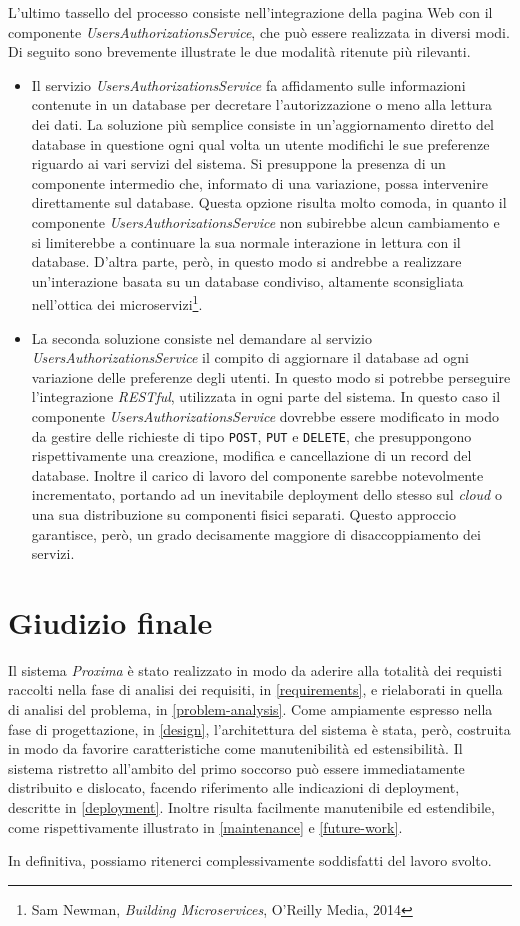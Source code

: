 \documentclass[a4paper,12pt]{report}
\begin{document}
L'ultimo tassello del processo consiste nell'integrazione della pagina Web con il componente \emph{UsersAuthorizationsService}, che può essere realizzata in diversi modi. Di seguito sono brevemente illustrate le due modalità ritenute più rilevanti.
\begin{itemize}
	\item Il servizio \emph{UsersAuthorizationsService} fa affidamento sulle informazioni contenute in un database per decretare l'autorizzazione o meno alla lettura dei dati. La soluzione più semplice consiste in un'aggiornamento diretto del database in questione ogni qual volta un utente modifichi le sue preferenze riguardo ai vari servizi del sistema. Si presuppone la presenza di un componente intermedio che, informato di una variazione, possa intervenire direttamente sul database. Questa opzione risulta molto comoda, in quanto il componente \emph{UsersAuthorizationsService} non subirebbe alcun cambiamento e si limiterebbe a continuare la sua normale interazione in lettura con il database. D'altra parte, però, in questo modo si andrebbe a realizzare un'interazione basata su un database condiviso, altamente sconsigliata nell'ottica dei microservizi\footnote{Sam Newman, {\em Building Microservices}, O'Reilly Media, 2014}.
	\item La seconda soluzione consiste nel demandare al servizio \emph{UsersAuthorizationsService} il compito di aggiornare il database ad ogni variazione delle preferenze degli utenti. In questo modo si potrebbe perseguire l'integrazione \emph{RESTful}, utilizzata in ogni parte del sistema. In questo caso il componente \emph{UsersAuthorizationsService} dovrebbe essere modificato in modo da gestire delle richieste di tipo \texttt{POST}, \texttt{PUT} e \texttt{DELETE}, che presuppongono rispettivamente una creazione, modifica e cancellazione di un record del database. Inoltre il carico di lavoro del componente sarebbe notevolmente incrementato, portando ad un inevitabile deployment dello stesso sul \emph{cloud} o una sua distribuzione su componenti fisici separati. Questo approccio garantisce, però, un grado decisamente maggiore di disaccoppiamento dei servizi.
\end{itemize}

\section{Giudizio finale}
Il sistema \emph{Proxima} è stato realizzato in modo da aderire alla totalità dei requisti raccolti nella fase di analisi dei requisiti, in \autoref{requirements}, e rielaborati in quella di analisi del problema, in \autoref{problem-analysis}. Come ampiamente espresso nella fase di progettazione, in \autoref{design}, l'architettura del sistema è stata, però, costruita in modo da favorire caratteristiche come manutenibilità ed estensibilità. Il sistema ristretto all'ambito del primo soccorso può essere immediatamente distribuito e dislocato, facendo riferimento alle indicazioni di deployment, descritte in \autoref{deployment}. Inoltre risulta facilmente manutenibile ed estendibile, come rispettivamente illustrato in \autoref{maintenance} e \autoref{future-work}.

In definitiva, possiamo ritenerci complessivamente soddisfatti del lavoro svolto. 
 
\end{document}

